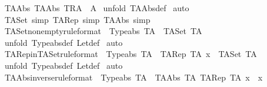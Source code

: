 \begin{isabellebody}
%
\isadelimproof
\isanewline
%
\endisadelimproof
\isanewline
{}\isamarkupfalse%
\ TAAbs{\isacharcolon}\ {\isachardoublequoteopen}TAAbs\ {\isacharparenleft}T{\isacharcomma}R{\isacharcomma}A{\isacharparenright}\ {\isacharequal}\ A{\isachardoublequoteclose}\isanewline
%
\isadelimproof
%
\endisadelimproof
%
\isatagproof
{}\isamarkupfalse%
\ {\isacharparenleft}unfold\ TAAbs{\isacharunderscore}def{\isacharparenright}\isanewline
{}\isamarkupfalse%
\ auto\isanewline
{}\isamarkupfalse%
%
\endisatagproof
{\isafoldproof}%
%
\isadelimproof
\isanewline
%
\endisadelimproof
\isanewline
{}\isamarkupfalse%
\ TASet\ {\isacharbrackleft}simp{\isacharbrackright}\ TARep\ {\isacharbrackleft}simp{\isacharbrackright}\ TAAbs\ {\isacharbrackleft}simp{\isacharbrackright}\isanewline
\isanewline
{}\isamarkupfalse%
\ TASet{\isacharunderscore}nonempty{\isacharbrackleft}rule{\isacharunderscore}format{\isacharbrackright}\ {\isacharcolon}\ {\isachardoublequoteopen}Typeabs\ TA\ {\isacharminus}{\isacharminus}{\isachargreater}\ {\isacharparenleft}TASet\ TA{\isacharparenright}\ {\isachartilde}{\isacharequal}\ {\isacharbraceleft}{\isacharbraceright}{\isachardoublequoteclose}\isanewline
%
\isadelimproof
%
\endisadelimproof
%
\isatagproof
{}\isamarkupfalse%
\ {\isacharparenleft}unfold\ Typeabs{\isacharunderscore}def\ Let{\isacharunderscore}def{\isacharparenright}\isanewline
{}\isamarkupfalse%
\ auto\isanewline
{}\isamarkupfalse%
%
\endisatagproof
{\isafoldproof}%
%
\isadelimproof
\isanewline
%
\endisadelimproof
\isanewline
{}\isamarkupfalse%
\ TARep{\isacharunderscore}in{\isacharunderscore}TASet{\isacharbrackleft}rule{\isacharunderscore}format{\isacharbrackright}\ {\isacharcolon}\ {\isachardoublequoteopen}Typeabs\ TA\ {\isacharminus}{\isacharminus}{\isachargreater}\ {\isacharparenleft}TARep\ TA\ x{\isacharparenright}\ {\isacharcolon}\ {\isacharparenleft}TASet\ TA{\isacharparenright}{\isachardoublequoteclose}\isanewline
%
\isadelimproof
%
\endisadelimproof
%
\isatagproof
{}\isamarkupfalse%
\ {\isacharparenleft}unfold\ Typeabs{\isacharunderscore}def\ Let{\isacharunderscore}def{\isacharparenright}\isanewline
{}\isamarkupfalse%
\ auto\isanewline
{}\isamarkupfalse%
%
\endisatagproof
{\isafoldproof}%
%
\isadelimproof
\isanewline
%
\endisadelimproof
\isanewline
{}\isamarkupfalse%
\ TAAbs{\isacharunderscore}inverse{\isacharbrackleft}rule{\isacharunderscore}format{\isacharbrackright}\ {\isacharcolon}\ {\isachardoublequoteopen}Typeabs\ TA\ {\isacharminus}{\isacharminus}{\isachargreater}\ {\isacharparenleft}TAAbs\ TA\ {\isacharparenleft}TARep\ TA\ x{\isacharparenright}{\isacharparenright}\ {\isacharequal}\ x{\isachardoublequoteclose}\isanewline

\end{isabellebody}

